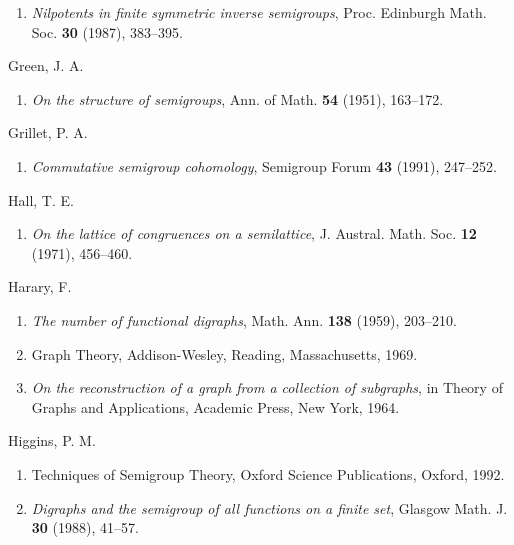 \documentclass{surv-l}
\numberwithin{equation}{section}
\numberwithin{table}{section}
\numberwithin{figure}{section}
\theoremstyle{plain}
\theoremstyle{definition}
\begin{document}
\begin{thebibliography}{}
\begin{enumerate}
\item \label{bib22a} \emph{Nilpotents in finite symmetric inverse
semigroups}, Proc. Edinburgh Math. Soc. \textbf{30}
(1987), 383--395.
\end{enumerate}

\item[] Green, J. A.
\begin{enumerate}
\item \label{bib24} \emph{On the structure of semigroups}, Ann. of Math.
\textbf{54} (1951), 163--172.
\end{enumerate}

\item[] Grillet, P. A.
\begin{enumerate}
\item \label{bib25} \emph{Commutative semigroup cohomology}, Semigroup
Forum \textbf{43} (1991), 247--252.
\end{enumerate}

\item[] Hall, T. E.
\begin{enumerate}
\item \label{bib26} \emph{On the lattice of congruences on a semilattice}, J. Austral. Math. Soc. \textbf{12} (1971), 456--460.
\end{enumerate}

\item[] Harary, F.
\begin{enumerate}
\item \label{bib27} \emph{The number of functional digraphs}, Math. Ann.
\textbf{138} (1959), 203--210.

\item \label{bib27a} Graph Theory, Addison-Wesley, Reading, Massachusetts,
1969.

\item \label{bib27b} \emph{On the reconstruction of a graph from a collection
of subgraphs}, in Theory of Graphs and Applications,
Academic Press, New York, 1964.
\end{enumerate}

\item[] Higgins, P. M.
\begin{enumerate}
\item \label{bib28} Techniques of Semigroup Theory, Oxford Science
Publications, Oxford, 1992.

\item \label{bib28a} \emph{Digraphs and the semigroup of all functions on
a finite set}, Glasgow Math. J. \textbf{30} (1988),
41--57.
\end{enumerate}


\end{thebibliography}
\end{document}
